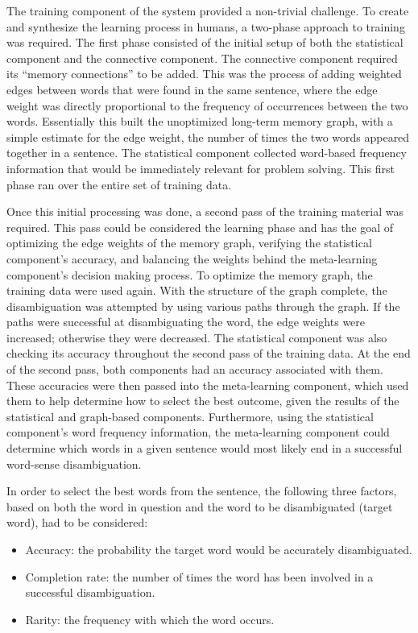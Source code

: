 The training component of the system provided a non-trivial challenge.  To
create and synthesize the learning process in humans, a two-phase approach to
training was required.  The first phase consisted of the initial setup of both
the statistical component and the connective component. The connective component
required its ``memory connections'' to be added.  This was the process of adding
weighted edges between words that were found in the same sentence, where the
edge weight was directly proportional to the frequency of occurrences between
the two words. Essentially this built the unoptimized long-term memory graph, with a
simple estimate for the edge weight, the number of times the two words appeared together 
in a sentence.  The statistical component collected word-based frequency information 
that would be immediately relevant for problem solving.  This first phase ran over 
the entire set of training data.

Once this initial processing was done, a second pass of the training material
was required.  This pass could be considered the learning phase and has the goal 
of optimizing the edge weights of the memory graph, verifying the statistical 
component's accuracy, and balancing the weights behind the meta-learning component's 
decision making process.  To optimize the memory graph, the training data were used 
again. With the structure of the graph complete, the disambiguation was attempted 
by using various paths through the graph.  If the paths were successful at disambiguating 
the word, the edge weights were increased; otherwise they were decreased. The 
statistical component was also checking its accuracy throughout the second pass of 
the training data.  At the end of the second pass, both 
components had an accuracy associated with them. These accuracies were then 
passed into the meta-learning component, which used them to help determine how to 
select the best outcome, given the results of the statistical and graph-based components.  
Furthermore, using the statistical component's word frequency information, the 
meta-learning component could determine which words in a given sentence would most 
likely end in a successful word-sense disambiguation. 

In order to select the best words from the sentence, the following three factors, based on both the 
word in question and the word to be disambiguated (target word), had to be considered: 

\begin{itemize}
	\item Accuracy: the probability the target word would be accurately disambiguated.
	\item Completion rate: the number of times the word has been involved in a 
	successful disambiguation.  
	\item Rarity: the frequency with which the word occurs.
\end{itemize}

